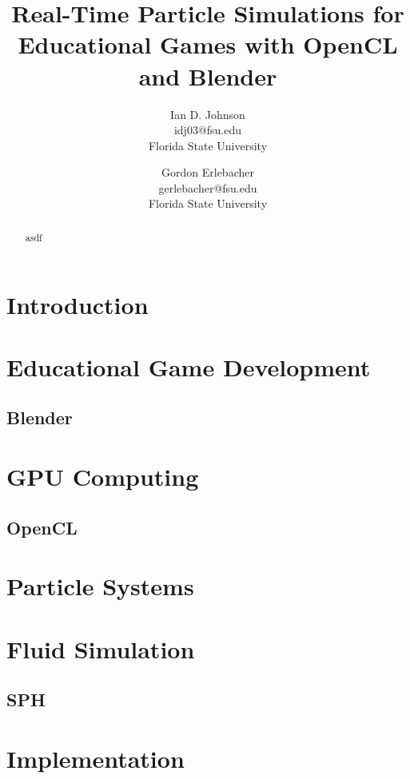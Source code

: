 \documentclass[letter,11pt]{article}
\title{\bf Real-Time Particle Simulations for Educational Games with OpenCL and Blender}
\author{Ian D. Johnson \\ idj03@fsu.edu \\ Florida State University \and Gordon Erlebacher \\ gerlebacher@fsu.edu \\ Florida State University }
\begin{document}

\maketitle
\tableofcontents
\listoffigures
\listoftables 

\begin{abstract}
    asdf
\end{abstract}

\section{Introduction}


\section{Educational Game Development}
\subsection{Blender}


\section{GPU Computing}
\subsection{OpenCL}


\section{Particle Systems}


\section{Fluid Simulation}
\subsection{SPH}

\section{Implementation}
\end{document}
